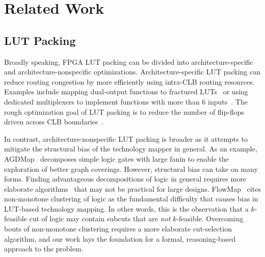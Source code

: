\section{Related Work}\label{sec:relatedwork}
\subsection{LUT Packing}\label{sec:relatedwork:fpga}
Broadly speaking, FPGA LUT packing can be divided into architecture-specific
and architecture-nonspecific optimizations. Architecture-specific LUT packing
can reduce routing congestion by more efficiently using intra-CLB routing
resources. Examples include mapping dual-output functions to fractured
LUTs~\cite{fraclut} or using dedicated multiplexers to implement functions with
more than 6 inputs~\cite{ug574}. The rough optimization goal of LUT packing is
to reduce the number of flip-flops driven across CLB boundaries~\cite{ffpack}.

In contrast, architecture-nonspecific LUT packing is broader as it attempts to
mitigate the structural bias of the technology mapper in general. As an
example, AGDMap~\cite{adaptdecomp} decomposes simple logic gates with large
fanin to enable the exploration of better graph coverings. However, structural
bias can take on many forms. Finding advantageous decompositions of logic in
general requires more elaborate algorithms~\cite{dsd} that may not be practical
for large designs. FlowMap~\cite{flowmap} cites non-monotone clustering of
logic as the fundamental difficulty that causes bias in LUT-based technology
mapping. In other words, this is the observation that a $k$-feasible cut of
logic may contain subcuts that are \textit{not} $k$-feasible. Overcoming bouts
of non-monotone clustering requires a more elaborate cut-selection algorithm,
and our work lays the foundation for a formal, reasoning-based approach to the
problem.

